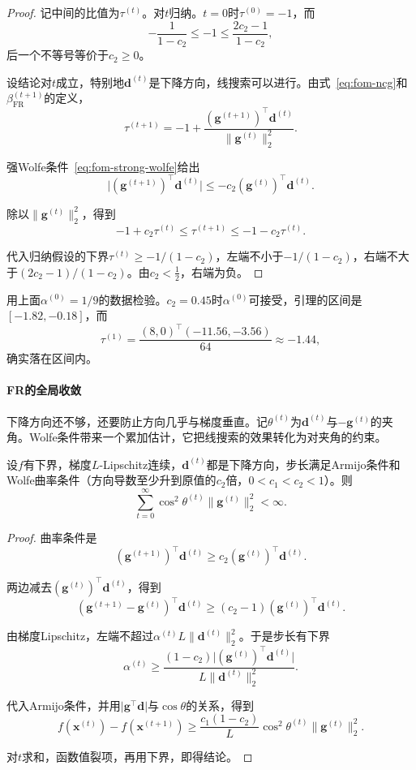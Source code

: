 \begin{proof}
记中间的比值为$\tau^{(t)}$。对$t$归纳。$t=0$时$\tau^{(0)}=-1$，而
\[
 -\frac{1}{1-c_2}\leq-1\leq\frac{2c_2-1}{1-c_2},
\]
后一个不等号等价于$c_2\geq0$。

设结论对$t$成立，特别地$\bm{d}^{(t)}$是下降方向，线搜索可以进行。由式~\eqref{eq:fom-ncg}和$\beta_{\mathrm{FR}}^{(t+1)}$的定义，
\[
 \tau^{(t+1)}=-1+\frac{(\bm{g}^{(t+1)})^\top\bm{d}^{(t)}}{\lVert\bm{g}^{(t)}\rVert_2^2}.
\]

强Wolfe条件~\eqref{eq:fom-strong-wolfe}给出
\[
 \bigl\lvert(\bm{g}^{(t+1)})^\top\bm{d}^{(t)}\bigr\rvert\leq-c_2(\bm{g}^{(t)})^\top\bm{d}^{(t)}.
\]

除以$\lVert\bm{g}^{(t)}\rVert_2^2$，得到
\[
 -1+c_2\tau^{(t)}\leq\tau^{(t+1)}\leq-1-c_2\tau^{(t)}.
\]

代入归纳假设的下界$\tau^{(t)}\geq-1/(1-c_2)$，左端不小于$-1/(1-c_2)$，右端不大于$(2c_2-1)/(1-c_2)$。由$c_2<\tfrac12$，右端为负。
\end{proof}

用上面$\alpha^{(0)}=1/9$的数据检验。$c_2=0.45$时$\alpha^{(0)}$可接受，引理的区间是$[-1.82,-0.18]$，而
\[
 \tau^{(1)}=\frac{(8,0)^\top(-11.56,-3.56)}{64}\approx-1.44,
\]
确实落在区间内。

\paragraph{FR的全局收敛}
下降方向还不够，还要防止方向几乎与梯度垂直。记$\theta^{(t)}$为$\bm{d}^{(t)}$与$-\bm{g}^{(t)}$的夹角。Wolfe条件带来一个累加估计，它把线搜索的效果转化为对夹角的约束。

\begin{lemma}[Zoutendijk条件]
\label{lem:fom-zoutendijk}
设$f$有下界，梯度$L$-Lipschitz连续，$\bm{d}^{(t)}$都是下降方向，步长满足Armijo条件和Wolfe曲率条件（方向导数至少升到原值的$c_2$倍，$0<c_1<c_2<1$）。则
\begin{equation}
 \sum_{t=0}^\infty\cos^2\theta^{(t)}\lVert\bm{g}^{(t)}\rVert_2^2<\infty.
 \label{eq:fom-zoutendijk}
\end{equation}
\end{lemma}

\begin{proof}
曲率条件是
\[
 (\bm{g}^{(t+1)})^\top\bm{d}^{(t)}\geq c_2(\bm{g}^{(t)})^\top\bm{d}^{(t)}.
\]

两边减去$(\bm{g}^{(t)})^\top\bm{d}^{(t)}$，得到
\[
 (\bm{g}^{(t+1)}-\bm{g}^{(t)})^\top\bm{d}^{(t)}\geq(c_2-1)(\bm{g}^{(t)})^\top\bm{d}^{(t)}.
\]

由梯度Lipschitz，左端不超过$\alpha^{(t)}L\lVert\bm{d}^{(t)}\rVert_2^2$。于是步长有下界
\[
 \alpha^{(t)}\geq\frac{(1-c_2)\lvert(\bm{g}^{(t)})^\top\bm{d}^{(t)}\rvert}{L\lVert\bm{d}^{(t)}\rVert_2^2}.
\]

代入Armijo条件，并用$\lvert\bm{g}^\top\bm{d}\rvert$与$\cos\theta$的关系，得到
\[
 f(\bm{x}^{(t)})-f(\bm{x}^{(t+1)})\geq\frac{c_1(1-c_2)}{L}\cos^2\theta^{(t)}\lVert\bm{g}^{(t)}\rVert_2^2.
\]

对$t$求和，函数值裂项，再用下界，即得结论。
\end{proof}

